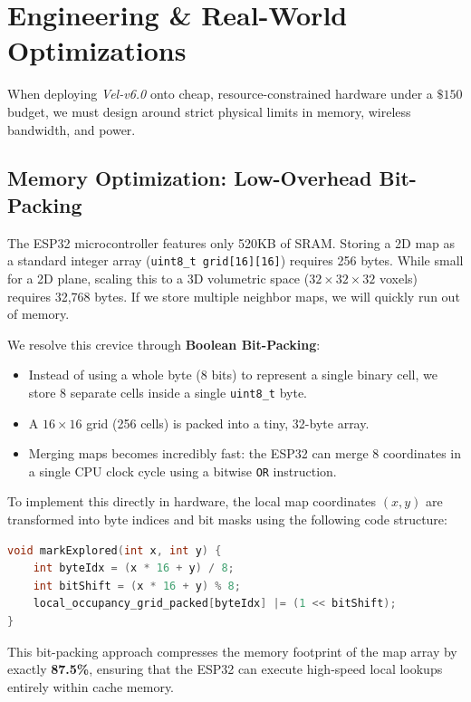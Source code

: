 \documentclass[letterpaper, 10pt, conference]{IEEEtran}
\begin{document}
\section{Engineering \& Real-World Optimizations}
\label{sec:engineering}

When deploying \textit{Vel-v6.0} onto cheap, resource-constrained hardware under a $\$150$ budget, we must design around strict physical limits in memory, wireless bandwidth, and power.

\subsection{Memory Optimization: Low-Overhead Bit-Packing}
The ESP32 microcontroller features only 520KB of SRAM. Storing a 2D map as a standard integer array (\texttt{uint8\_t grid[16][16]}) requires 256 bytes. While small for a 2D plane, scaling this to a 3D volumetric space ($32 \times 32 \times 32$ voxels) requires 32,768 bytes. If we store multiple neighbor maps, we will quickly run out of memory.

We resolve this crevice through \textbf{Boolean Bit-Packing}:
\begin{itemize}
    \item Instead of using a whole byte (8 bits) to represent a single binary cell, we store 8 separate cells inside a single \texttt{uint8\_t} byte.
    \item A $16 \times 16$ grid (256 cells) is packed into a tiny, 32-byte array.
    \item Merging maps becomes incredibly fast: the ESP32 can merge 8 coordinates in a single CPU clock cycle using a bitwise \texttt{OR} instruction.
\end{itemize}

To implement this directly in hardware, the local map coordinates $(x,y)$ are transformed into byte indices and bit masks using the following code structure:
\begin{lstlisting}[language=C++]
void markExplored(int x, int y) {
    int byteIdx = (x * 16 + y) / 8;
    int bitShift = (x * 16 + y) % 8;
    local_occupancy_grid_packed[byteIdx] |= (1 << bitShift);
}
\end{lstlisting}

This bit-packing approach compresses the memory footprint of the map array by exactly \textbf{87.5\%}, ensuring that the ESP32 can execute high-speed local lookups entirely within cache memory.
\end{document}
